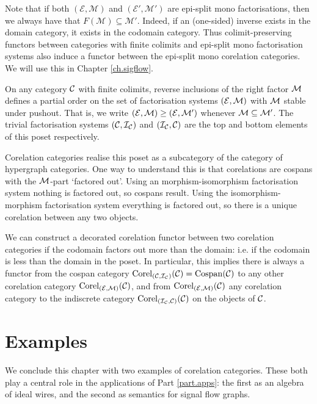 \begin{example}
Note that if both $(\mathcal E, \mathcal M)$ and $(\mathcal E', \mathcal M')$
are epi-split mono factorisations, then we always have that $F(\mathcal M)
\subseteq \mathcal M'$. Indeed, if an (one-sided) inverse exists in the domain
category, it exists in the codomain category. Thus colimit-preserving functors
between categories with finite colimits and epi-split mono factorisation systems
also induce a functor between the epi-split mono corelation categories. We will
use this in Chapter \ref{ch.sigflow}.
\end{example}

\begin{remark} \label{rem.corelposet}
On any category $\mathcal C$ with finite colimits, reverse inclusions of the right factor
$\mathcal M$ defines a partial order on the set of factorisation systems $(\mathcal E,\mathcal
M)$ with $\mathcal M$ stable under pushout. That is, we write $(\mathcal E,\mathcal M) \ge (\mathcal
E,\mathcal M')$ whenever $\mathcal M \subseteq \mathcal M'$.  The trivial factorisation
systems $(\mathcal C,\mathcal I_{\mathcal C})$ and $(\mathcal I_{\mathcal C},\mathcal C)$ are the top and
bottom elements of this poset respectively.

Corelation categories realise this poset as a subcategory of the category of
hypergraph categories. One way to understand this is that corelations are
cospans with the $\mathcal M$-part `factored out'. Using an morphism-isomorphism
factorisation system nothing is factored out, so cospans result. Using the
isomorphism-morphism factorisation system everything is factored out, so there
is a unique corelation between any two objects.

We can construct a decorated corelation functor between two corelation
categories if the codomain factors out more than the domain: i.e. if the
codomain is less than the domain in the poset. In particular, this implies
there is always a functor from the cospan category $\operatorname{{Corel}}_{(\mathcal C,\mathcal I_{\mathcal
C})}(\mathcal C)= \operatorname{{Cospan}}(\mathcal C)$ to any other corelation category $\operatorname{{Corel}}_{(\mathcal
E,\mathcal M)}(\mathcal C)$, and from $\operatorname{{Corel}}_{(\mathcal E,\mathcal M)}(\mathcal C)$ any corelation
category to the indiscrete category $\operatorname{{Corel}}_{(\mathcal I_{\mathcal C},\mathcal C)}(\mathcal C)$ on
the objects of $\mathcal C$.
\end{remark}

\section{Examples} \label{sec.corelexs}
We conclude this chapter with two examples of corelation categories. These both
play a central role in the applications of Part \ref{part.apps}: the first as
an algebra of ideal wires, and the second as semantics for signal flow graphs.

